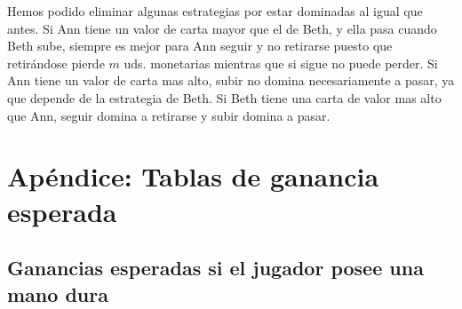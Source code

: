 \documentclass[12pt,a4paper,]{book}
\def\ifdoblecara{} %
\def\ifprincipal{} %
\numberwithin{dummy}{section}
\theoremstyle{ocrenumbox}
\theoremstyle{blacknumex}
\theoremstyle{blacknumbox}
\theoremstyle{ocrenum}
\theoremstyle{ocrenum}
\begin{document}
Hemos podido eliminar algunas estrategias por estar dominadas al igual
que antes. Si Ann tiene un valor de carta mayor que el de Beth, y ella
pasa cuando Beth sube, siempre es mejor para Ann seguir y no retirarse
puesto que retirándose pierde \(m\) uds. monetarias mientras que si
sigue no puede perder. Si Ann tiene un valor de carta mas alto, subir no
domina necesariamente a pasar, ya que depende de la estrategia de Beth.
Si Beth tiene una carta de valor mas alto que Ann, seguir domina a
retirarse y subir domina a pasar.

\FloatBarrier

\appendix

\ifdefined\ifprincipal
\else
\setlength{\parindent}{1em}
\pagestyle{fancy}
\setcounter{tocdepth}{4}
\tableofcontents

\fi

\ifdefined\ifdoblecara
\fancyhead{}{}
\fancyhead[LE,RO]{\scriptsize\rightmark}
\fancyfoot[LO,RE]{\scriptsize\slshape \leftmark}
\fancyfoot[C]{}
\fancyfoot[LE,RO]{\footnotesize\thepage}
\else
\fancyhead{}{}
\fancyhead[RO]{\scriptsize\rightmark}
\fancyfoot[LO]{\scriptsize\slshape \leftmark}
\fancyfoot[C]{}
\fancyfoot[RO]{\footnotesize\thepage}
\fi

\renewcommand{\headrulewidth}{0.4pt}
\renewcommand{\footrulewidth}{0.4pt}

\hypertarget{apuxe9ndice-tablas-de-ganancia-esperada}{%
\chapter{Apéndice: Tablas de ganancia
esperada}\label{apuxe9ndice-tablas-de-ganancia-esperada}}

\hypertarget{ganancias-esperadas-si-el-jugador-posee-una-mano-dura}{%
\section{Ganancias esperadas si el jugador posee una mano
dura}\label{ganancias-esperadas-si-el-jugador-posee-una-mano-dura}}

\begingroup\fontsize{12}{14}\selectfont
\end{document}
